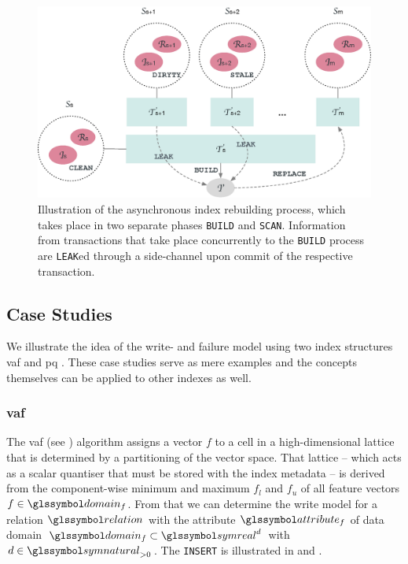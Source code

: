 \begin{figure}
    \centering
    \includegraphics[width=\textwidth]{figures/asynchronous-index-rebuilding}
    \caption{Illustration of the asynchronous index rebuilding process, which takes place in two separate phases \texttt{BUILD} and \texttt{SCAN}. Information from transactions that take place concurrently to the  \texttt{BUILD} process are \texttt{LEAK}ed through a side-channel upon commit of the respective transaction.}
    \label{figure:async_index_rebuild}
\end{figure}

\subsection{Case Studies}

We illustrate the idea of the write- and failure model using two index structures \acrshort{vaf} \cite{Weber:1998Va} and \acrshort{pq} \cite{Jegou:2010Product}. These case studies serve as mere examples and the concepts themselves can be applied to other indexes as well.

\subsubsection{\texorpdfstring{\acrfull{vaf}}{VAF}}

The \acrshort{vaf} (see ) algorithm assigns a vector $f$ to a cell in a high-dimensional lattice that is determined by a partitioning of the vector space. That lattice -- which acts as a scalar quantiser that must be stored with the index metadata -- is derived from the component-wise minimum and maximum $f_{l}$ and $f_{u}$ of all feature vectors $f \in \domain_f$. From that we can determine the write model for a relation $\relation$ with the attribute $\attribute_f$ of data domain $\domain_f \subset \symreal^d$ with $d \in \symnatural_{>0}$. The \texttt{INSERT} is illustrated in  and .


